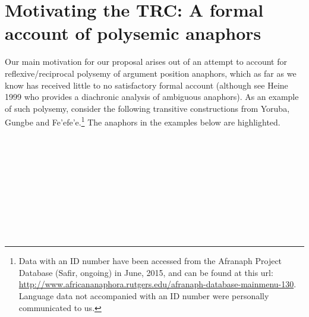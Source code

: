 \chapter{Motivating the TRC: A formal account of polysemic anaphors}
\setcounter{listWWviiiNumxixleveli}{0}
\begin{listWWviiiNumxixleveli}
\begin{styleExample}
  Our main motivation for our proposal arises out of an attempt to account for reflexive/reciprocal polysemy of argument position anaphors, which as far as we know has received little to no satisfactory formal account (although see Heine 1999 who provides a diachronic analysis of ambiguous anaphors). As an example of such polysemy, consider the following transitive constructions from Yoruba, Gungbe and Fe'efe'e.\footnote{ Data with an ID number have been accessed from the Afranaph Project Database (Safir, ongoing) in June, 2015, and can be found at this url: \url{http://www.africananaphora.rutgers.edu/afranaph-database-mainmenu-130}. Language data not accompanied with an ID number were personally communicated to us.} The anaphors in the examples below are highlighted.
\end{styleExample}
\end{listWWviiiNumxixleveli}
\setcounter{listWWviiiNumxlileveli}{0}
\begin{listWWviiiNumxlileveli}
\item \ea\label{ex:}
\\
\ea\label{ex:}
\\
\ea\label{ex:}
\\
\ea\label{ex:}
\\
\end{listWWviiiNumxlileveli}
\begin{listWWviiiNumxlileveli}
\item \ea\label{ex:}
\\
\ea\label{ex:}
\\
\ea\label{ex:}
\\
\ea\label{ex:}
\\
\end{listWWviiiNumxlileveli}
